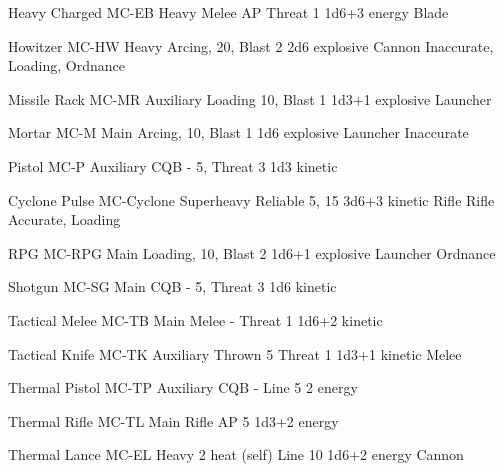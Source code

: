 Heavy Charged        MC-EB              Heavy Melee     AP                  Threat 1        1d6+3 energy 
Blade 

Howitzer             MC-HW              Heavy           Arcing,              20, Blast 2   2d6 explosive 
                                        Cannon           Inaccurate,  
                                                         Loading,  
                                                         Ordnance 

Missile Rack         MC-MR              Auxiliary        Loading             10, Blast 1    1d3+1 explosive 
                                        Launcher 

Mortar               MC-M               Main            Arcing,              10, Blast 1    1d6 explosive 
                                        Launcher         Inaccurate 

Pistol               MC-P               Auxiliary CQB    -                   5, Threat 3    1d3 kinetic 

                                                                                                           


 Cyclone Pulse        MC-Cyclone         Superheavy       Reliable 5,         15             3d6+3 kinetic 
 Rifle                                    Rifle             Accurate,  
                                                          Loading 

 RPG                  MC-RPG             Main             Loading,            10, Blast 2    1d6+1 explosive 
                                         Launcher         Ordnance 

 Shotgun              MC-SG              Main CQB         -                   5, Threat 3    1d6 kinetic 

 Tactical Melee       MC-TB              Main Melee       -                   Threat 1       1d6+2 kinetic 

 Tactical Knife       MC-TK              Auxiliary        Thrown 5            Threat 1       1d3+1 kinetic 
                                         Melee 

 Thermal Pistol       MC-TP              Auxiliary CQB    -                   Line 5         2 energy 

 Thermal Rifle         MC-TL              Main Rifle        AP                  5              1d3+2 energy 

 Thermal Lance        MC-EL              Heavy            2 heat (self)       Line 10        1d6+2 energy 
                                         Cannon 

